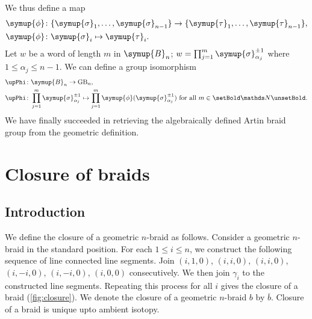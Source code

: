 \documentclass[oneside]{book}
\renewcommand{\symbb}[1]{\setBold \mathds #1 \unsetBold}
\newcommand{\B}{\symup{B}}
\newcommand{\GB}{\text{GB}}
\newcommand{\sigmaa}{\symup{\sigma}}
\newcommand{\tauu}{\symup{\tau}}
\newcommand{\upphi}{\symup{\phi}}
\theoremstyle{definition}
\begin{document}
	We thus define a map
	\begin{align*}
		\upphi \colon &\{\sigmaa_1, \ldots, \sigmaa_{n-1}\} \rightarrow \{\tauu_1, \ldots, \tauu_{n-1}\},\\
		\upphi \colon &\sigmaa_i \mapsto \tauu_i.
	\end{align*}
	Let \(w\) be a word of length \(m\) in \(\B_n\); \(w = \prod_{j=1}^{m} \sigmaa^{\pm 1}_{\alpha_j}\) where \(1 \leq \alpha_j \leq n-1\). We can define a group isomorphism
	\begin{align*}
		\upPhi &\colon \B_n \rightarrow \GB_n,\\
		\upPhi &\colon \prod_{j=1}^{m} \sigmaa^{\pm 1}_{\alpha_j} \mapsto \prod_{j=1}^{m} \upphi(\sigmaa^{\pm 1}_{\alpha_j}) \text{ for all } m \in \symbb{N}.
	\end{align*}
	We have finally succeeded in retrieving the algebraically defined Artin braid group from the geometric definition.

	\section{Closure of braids}

	\subsection{Introduction}

	We define the closure of a geometric \(n\)-braid as follows. Consider a geometric \(n\)-braid in the standard position. For each \(1 \leq i \leq n\), we construct the following sequence of line connected line segments. Join \((i, 1, 0)\), \((i, i, 0)\), \((i, i, 0)\), \((i, -i, 0)\), \((i, -i, 0)\), \((i, 0, 0)\) consecutively. We then join \(\gamma_i\) to the constructed line segments. Repeating this process for all \(i\) gives the closure of a braid (\cref{fig:closure}). We denote the closure of a geometric \(n\)-braid \(b\) by \(\overline{b}\). Closure of a braid is unique upto ambient isotopy.
\end{document}
